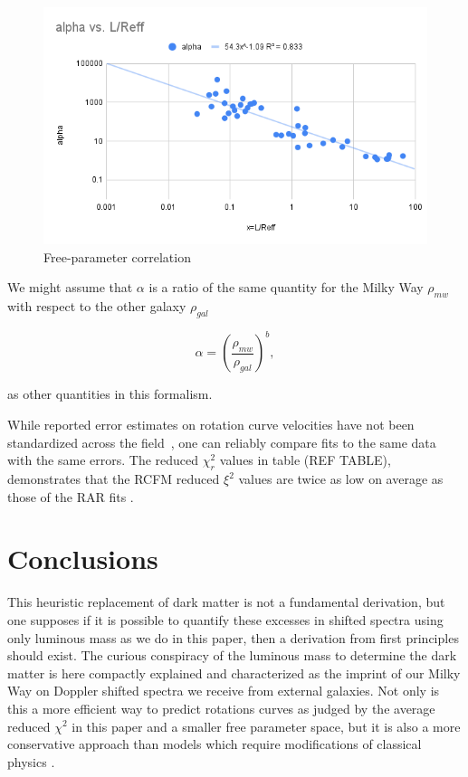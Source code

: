 \documentclass[reprint,%
 amsmath,amssymb,
 aps,
]{revtex4-1}
\begin{document}
 \begin{figure}[h]
\includegraphics[width=\linewidth]{alphavL_Reff.png} 
\caption{  Free-parameter correlation   }
\label{alpha2}
\end{figure}  
 


We might assume that $\alpha$ is a ratio of the same quantity for  the Milky Way $\rho_{mw}$ with respect to the other   galaxy $\rho_{gal}$  

\begin{equation}
\alpha=\left(\frac{\rho_{mw}}{\rho_{gal}}\right)^{b}  ,
\label{correl}
\end{equation}

as other quantities in this formalism.
 

While reported error    estimates on rotation curve velocities  have not been standardized across the field~\citep{Blok,Gent},     one can reliably   compare fits to the same data with the same  errors. The     reduced $\chi^2_r$ values in table (REF TABLE), demonstrates that the RCFM reduced $\xi^2$ values are twice as low on average as those of the RAR fits  \cite{McGaugh2016RAR}.


 
 \section{  Conclusions \label{sec:conclu}  }
 

This heuristic replacement of dark matter is not a fundamental derivation, but    one supposes if it is possible to quantify these
excesses in shifted spectra using only luminous mass as we do in this paper,  then a       derivation from first principles should   exist.  The curious conspiracy of the luminous mass to   determine the dark matter  is here   compactly explained and characterized as the imprint of our Milky Way on Doppler shifted spectra we receive from external galaxies. Not only is this a more efficient way to predict rotations curves as judged by the average reduced $\chi^2$ in this paper and a smaller free parameter space, but it is also a  more conservative approach than models which require modifications of classical physics  \cite{de_Blok_2010}.  
  
\end{document}
